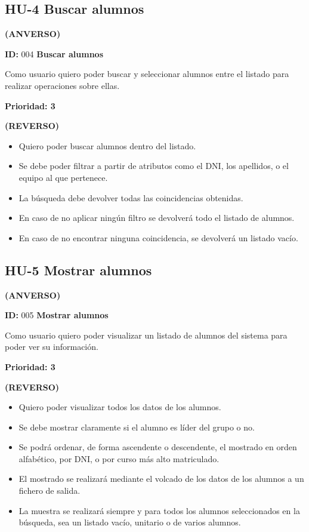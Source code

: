 \subsection{HU-4 Buscar alumnos}
\textbf{(ANVERSO)}

\textbf{ID:} 004 \textbf{Buscar alumnos}

Como usuario quiero poder buscar y seleccionar alumnos entre el listado para realizar operaciones sobre ellas.

\textbf{Prioridad: 3}

\textbf{(REVERSO)}
\begin{itemize}
	\item Quiero poder buscar alumnos dentro del listado.
	\item Se debe poder filtrar a partir de atributos como el DNI, los apellidos, o el equipo al que pertenece.
	\item La búsqueda debe devolver todas las coincidencias obtenidas.
	\item En caso de no aplicar ningún filtro se devolverá todo el listado de alumnos.
	\item En caso de no encontrar ninguna coincidencia, se devolverá un listado vacío.
\end{itemize}

\subsection{HU-5 Mostrar alumnos}
\textbf{(ANVERSO)}

\textbf{ID:} 005 \textbf{Mostrar alumnos}

Como usuario quiero poder visualizar un listado de alumnos del sistema para poder ver su información.

\textbf{Prioridad: 3}

\textbf{(REVERSO)}
\begin{itemize}
	\item Quiero poder visualizar todos los datos de los alumnos.
	\item Se debe mostrar claramente si el alumno es líder del grupo o no.
	\item Se podrá ordenar, de forma ascendente o descendente, el mostrado en orden alfabético, por DNI, o por curso más alto matriculado.
	\item El mostrado se realizará mediante el volcado de los datos de los alumnos a un fichero de salida.
	\item La muestra se realizará siempre y para todos los alumnos seleccionados en la búsqueda, sea un listado vacío, unitario o de varios alumnos.
\end{itemize}

